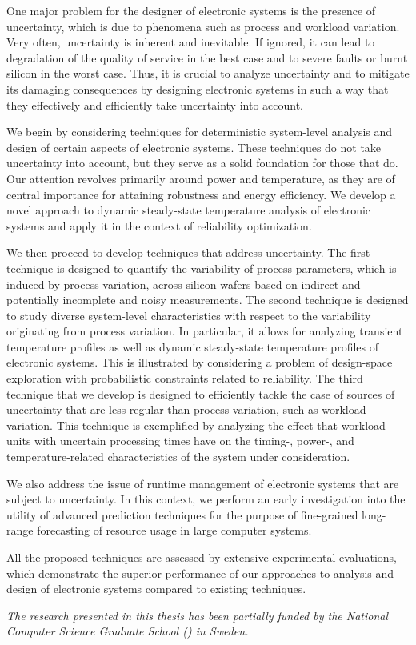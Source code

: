 One major problem for the designer of electronic systems is the presence of
uncertainty, which is due to phenomena such as process and workload variation.
Very often, uncertainty is inherent and inevitable. If ignored, it can lead to
degradation of the quality of service in the best case and to severe faults or
burnt silicon in the worst case. Thus, it is crucial to analyze uncertainty and
to mitigate its damaging consequences by designing electronic systems in such a
way that they effectively and efficiently take uncertainty into account.

We begin by considering techniques for deterministic system-level analysis and
design of certain aspects of electronic systems. These techniques do not take
uncertainty into account, but they serve as a solid foundation for those that
do. Our attention revolves primarily around power and temperature, as they are
of central importance for attaining robustness and energy efficiency. We develop
a novel approach to dynamic steady-state temperature analysis of electronic
systems and apply it in the context of reliability optimization.

We then proceed to develop techniques that address uncertainty. The first
technique is designed to quantify the variability of process parameters, which
is induced by process variation, across silicon wafers based on indirect and
potentially incomplete and noisy measurements. The second technique is designed
to study diverse system-level characteristics with respect to the variability
originating from process variation. In particular, it allows for analyzing
transient temperature profiles as well as dynamic steady-state temperature
profiles of electronic systems. This is illustrated by considering a problem of
design-space exploration with probabilistic constraints related to reliability.
The third technique that we develop is designed to efficiently tackle the case
of sources of uncertainty that are less regular than process variation, such as
workload variation. This technique is exemplified by analyzing the effect that
workload units with uncertain processing times have on the timing-, power-, and
temperature-related characteristics of the system under consideration.

We also address the issue of runtime management of electronic systems that are
subject to uncertainty. In this context, we perform an early investigation into
the utility of advanced prediction techniques for the purpose of fine-grained
long-range forecasting of resource usage in large computer systems.

All the proposed techniques are assessed by extensive experimental evaluations,
which demonstrate the superior performance of our approaches to analysis and
design of electronic systems compared to existing techniques.

\vspace{1em}
\noindent
\emph{
  The research presented in this thesis has been partially funded by the
  National Computer Science Graduate School () in Sweden.
}
